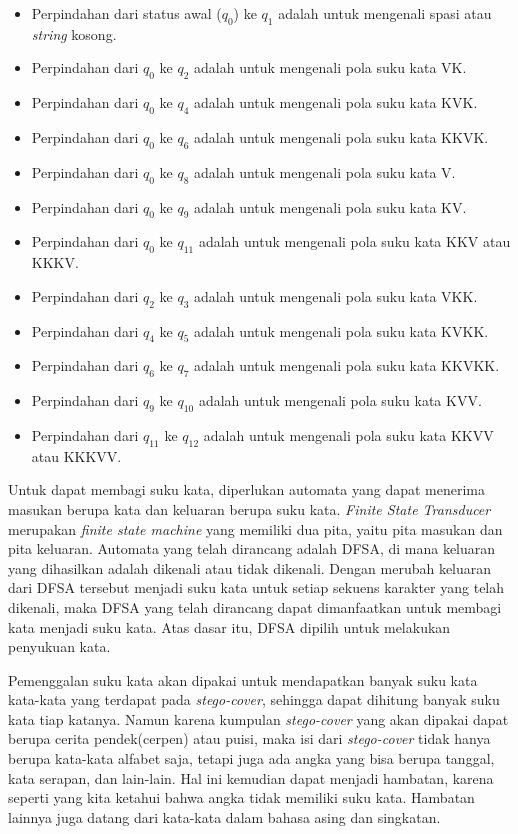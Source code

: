 \begin{itemize}
	\item Perpindahan dari status awal (\textit{$q_0$}) ke \textit{$q_1$} adalah untuk mengenali spasi atau \textit{string} kosong.
	\item Perpindahan dari \textit{$q_0$} ke \textit{$q_2$} adalah untuk mengenali pola suku kata VK.
	\item Perpindahan dari \textit{$q_0$} ke \textit{$q_4$} adalah untuk mengenali pola suku kata KVK.
	\item Perpindahan dari \textit{$q_0$} ke \textit{$q_6$} adalah untuk mengenali pola suku kata KKVK.
	\item Perpindahan dari \textit{$q_0$} ke \textit{$q_8$} adalah untuk mengenali pola suku kata V.
	\item Perpindahan dari \textit{$q_0$} ke \textit{$q_9$} adalah untuk mengenali pola suku kata KV.
	\item Perpindahan dari \textit{$q_0$} ke \textit{$q_{11}$} adalah untuk mengenali pola suku kata KKV atau KKKV.
	\item Perpindahan dari \textit{$q_2$} ke \textit{$q_3$} adalah untuk mengenali pola suku kata VKK.
	\item Perpindahan dari \textit{$q_4$} ke \textit{$q_5$} adalah untuk mengenali pola suku kata KVKK.
	\item Perpindahan dari \textit{$q_6$} ke \textit{$q_7$} adalah untuk mengenali pola suku kata KKVKK.
	\item Perpindahan dari \textit{$q_9$} ke \textit{$q_{10}$} adalah untuk mengenali pola suku kata KVV.
	\item Perpindahan dari \textit{$q_{11}$} ke \textit{$q_{12}$} adalah untuk mengenali pola suku kata KKVV atau KKKVV.
\end{itemize}

Untuk dapat membagi suku kata, diperlukan automata yang dapat menerima masukan berupa kata dan keluaran berupa suku kata. \textit{Finite State Transducer} merupakan \textit{finite state machine} yang memiliki dua pita, yaitu pita masukan dan pita keluaran. Automata yang telah dirancang adalah DFSA, di mana keluaran yang dihasilkan adalah dikenali atau tidak dikenali. Dengan merubah keluaran dari DFSA tersebut menjadi suku kata untuk setiap sekuens karakter yang telah dikenali, maka DFSA yang telah dirancang dapat dimanfaatkan untuk membagi kata menjadi suku kata. Atas dasar itu, DFSA dipilih untuk melakukan penyukuan kata.

Pemenggalan suku kata akan dipakai untuk mendapatkan banyak suku kata kata-kata yang terdapat pada \textit{stego-cover}, sehingga dapat dihitung banyak suku kata tiap katanya. Namun karena kumpulan \textit{stego-cover} yang akan dipakai dapat berupa cerita pendek(cerpen) atau puisi, maka isi dari \textit{stego-cover} tidak hanya berupa kata-kata alfabet saja, tetapi juga ada angka yang bisa berupa tanggal, kata serapan, dan lain-lain. Hal ini kemudian dapat menjadi hambatan, karena seperti yang kita ketahui bahwa angka tidak memiliki suku kata. Hambatan lainnya juga datang dari kata-kata dalam bahasa asing dan singkatan.

